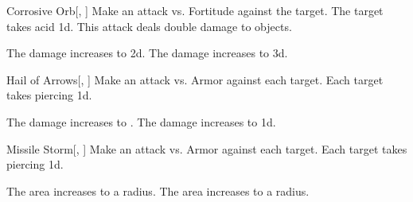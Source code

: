\lowercase{\hypertarget{spell:Corrosive Orb}{}}\label{spell:Corrosive Orb}
\begin{freeability}[Rank 3]{\hypertarget{spell:Corrosive Orb}{Corrosive Orb}}[, ]
Make an attack vs. Fortitude against the target.
\hit The target takes acid  \plus1d.
This attack deals double damage to objects.

\rankline
{} The damage increases to  \plus2d.
 The damage increases to  \plus3d.
\end{freeability}
\vspace{0.25em}



\lowercase{\hypertarget{spell:Hail of Arrows}{}}\label{spell:Hail of Arrows}
\begin{freeability}[Rank 3]{\hypertarget{spell:Hail of Arrows}{Hail of Arrows}}[, ]
Make an attack vs. Armor against each target.
\hit Each target takes piercing  \minus1d.

\rankline
{} The damage increases to .
 The damage increases to  \plus1d.
\end{freeability}
\vspace{0.25em}



\lowercase{\hypertarget{spell:Missile Storm}{}}\label{spell:Missile Storm}
\begin{freeability}[Rank 3]{\hypertarget{spell:Missile Storm}{Missile Storm}}[, ]
Make an attack vs. Armor against each target.
\hit Each target takes piercing  \minus1d.

\rankline
{} The area increases to a \arealarge radius.
 The area increases to a \areahuge radius.
\end{freeability}
\vspace{0.25em}



